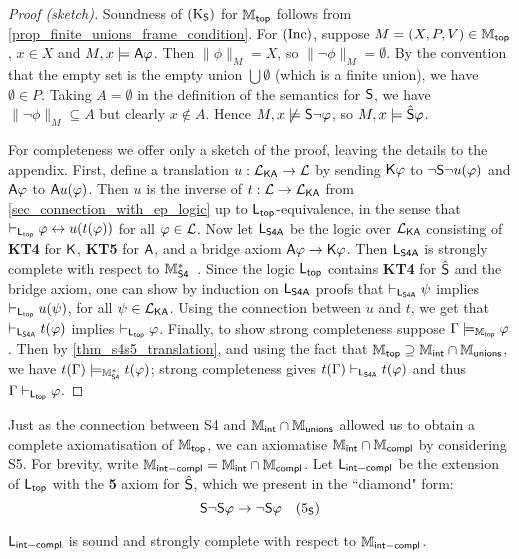 \begin{proof}[Proof (sketch)]

    Soundness of $\Ksoundness$ for $\Mtop$ follows from
    \cref{prop_finite_unions_frame_condition}. For $\inc$, suppose $M = (X, P,
    V) \in \Mtop$, $x \in X$ and $M, x \models \A\phi$. Then $\|\phi\|_M = X$,
    so $\|\neg\phi\|_M = \emptyset$. By the convention that the empty set is
    the empty union $\bigcup\emptyset$ (which is a finite union), we have
    $\emptyset \in P$. Taking $A = \emptyset$ in the definition of the
    semantics for $\S$, we have $\|\neg\phi\|_M \subseteq A$ but clearly $x
    \notin A$. Hence $M, x \not\models \S\neg\phi$, so $M, x \models
    \hat\S\phi$.

    For completeness we offer only a sketch of the proof, leaving the details
    to the appendix. First, define a translation $u: \cLKA \to \cL$ by sending
    $\K\phi$ to $\neg\S\neg u(\phi)$ and $\A\phi$ to $\A u(\phi)$. Then $u$ is
    the inverse of $t: \cL \to \cLKA$ from \cref{sec_connection_with_ep_logic}
    up to $\sLtop$-equivalence, in the sense that $\entails_{\sLtop} \phi \liff
    u(t(\phi))$ for all $\phi \in \cL$. Now let $\sLsfoura$ be the logic over
    $\cLKA$ consisting of \textbf{KT4} for $\K$, \textbf{KT5} for $\A$, and a
    bridge axiom $\A\phi \limplies \K\phi$. Then $\sLsfoura$ is strongly
    complete with respect to $\Msfour$~\citep[Theorem 7.2]{blackburn2002modal}.
    Since the logic
    $\sLtop$ contains \textbf{KT4} for $\hat\S$ and the bridge axiom, one can
    show by induction on $\sLsfoura$ proofs that $\entails_{\sLsfoura}\psi$
    implies $\entails_{\sLtop}u(\psi)$, for all $\psi \in \cLKA$. Using the
    connection between $u$ and $t$, we get that $\entails_{\sLsfoura}t(\phi)$
    implies $\entails_{\sLtop}\phi$. Finally, to show strong completeness
    suppose $\Gamma \models_{\Mtop} \phi$. Then by \cref{thm_s4s5_translation},
    and using the fact that $\Mtop \supseteq \Mint \cap \Munions$, we have
    $t(\Gamma) \models_{\Msfour} t(\phi)$; strong completeness gives $t(\Gamma)
    \entails_{\sLsfoura} t(\phi)$ and thus $\Gamma \entails_{\sLtop} \phi$.

\end{proof}

Just as the connection between S4 and $\Mint \cap \Munions$ allowed us
to obtain a complete axiomatisation of $\Mtop$, we can axiomatise $\Mint \cap
\Mcompl$ by considering S5. For brevity, write $\Mintcompl = \Mint
\cap \Mcompl$. Let $\sLintcompl$ be the extension of $\sLtop$
with the \textbf{5} axiom for $\hat\S$, which we present in the ``diamond"
form:
\[
\S\neg\S\phi \limplies \neg\S\phi
\quad
\fivesoundness\]
\begin{theorem}
\label{thm_mintcompl_axiomatisation}
$\sLintcompl$ is sound and strongly complete with respect to
$\Mintcompl$.
\end{theorem}

